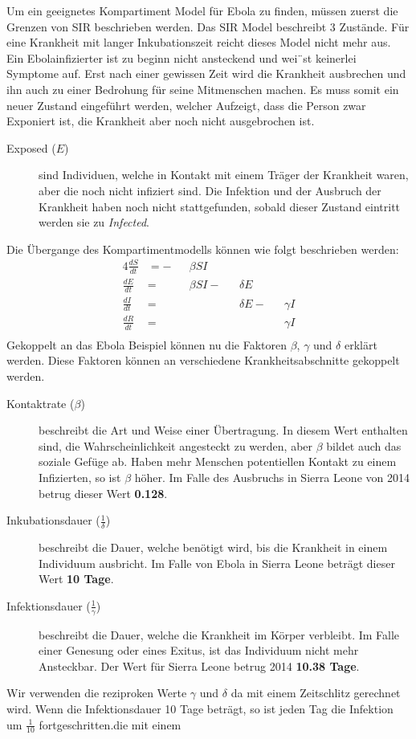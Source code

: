 \begin{refsection}
Um ein geeignetes Kompartiment Model für Ebola zu finden, müssen zuerst die Grenzen von SIR beschrieben werden. Das SIR Model beschreibt 3 Zustände. Für eine Krankheit mit langer Inkubationszeit reicht dieses Model nicht mehr aus. Ein Ebolainfizierter ist zu beginn nicht ansteckend und wei¨st keinerlei Symptome auf. Erst nach einer gewissen Zeit wird die Krankheit ausbrechen und ihn auch zu einer Bedrohung für seine Mitmenschen machen. Es muss somit ein neuer Zustand eingeführt werden, welcher Aufzeigt, dass die Person zwar Exponiert ist, die Krankheit aber noch nicht ausgebrochen ist.
\begin{figure}[H]
  \centering
  
\end{figure}
\begin{description}
  \item [Exposed ($E$)] sind Individuen, welche in Kontakt mit einem Träger der Krankheit waren, aber die noch nicht infiziert sind. Die Infektion und der Ausbruch der Krankheit haben noch nicht stattgefunden, sobald dieser Zustand eintritt werden sie zu \emph{Infected}.
\end{description}
Die Übergange des Kompartimentmodells können wie folgt beschrieben werden:
 \begin{alignat*}{4}
   \frac{dS}{dt} & = - &   & \beta S I & & \\
   \frac{dE}{dt} & =   &   & \beta S I - &   & \delta E & & \\
   \frac{dI}{dt} & =   &   &  &   & \delta E - & & \gamma I \\
   \frac{dR}{dt} & =   &   &  &   &  & & \gamma I \\
 \end{alignat*}
Gekoppelt an das Ebola Beispiel können nu die Faktoren $\beta$, $\gamma$ und $\delta$ erklärt werden. Diese Faktoren können an verschiedene Krankheitsabschnitte gekoppelt werden.
\begin{description}
  \item [Kontaktrate ($\beta$)] beschreibt die Art und Weise einer Übertragung. In diesem Wert enthalten sind, die Wahrscheinlichkeit angesteckt zu werden, aber $\beta$ bildet auch das soziale Gefüge ab. Haben mehr Menschen potentiellen Kontakt zu einem Infizierten, so ist $\beta$ höher. Im Falle des Ausbruchs in Sierra Leone von 2014 betrug dieser Wert \textbf{0.128}.
  \item [Inkubationsdauer ($\frac{1}{\delta}$)] beschreibt die Dauer, welche benötigt wird, bis die Krankheit in einem Individuum ausbricht. Im Falle von Ebola in Sierra Leone beträgt dieser Wert \textbf{10 Tage}.
  \item [Infektionsdauer ($\frac{1}{\gamma}$)] beschreibt die Dauer, welche die Krankheit im Körper verbleibt. Im Falle einer Genesung oder eines Exitus, ist das Individuum nicht mehr Ansteckbar. Der Wert für Sierra Leone betrug 2014 \textbf{10.38 Tage}.
\end{description}
Wir verwenden die reziproken Werte $\gamma$ und $\delta$ da mit einem Zeitschlitz gerechnet wird. Wenn die Infektionsdauer 10 Tage beträgt, so ist jeden Tag die Infektion um $\frac{1}{10}$ fortgeschritten.die mit einem


\end{refsection}
